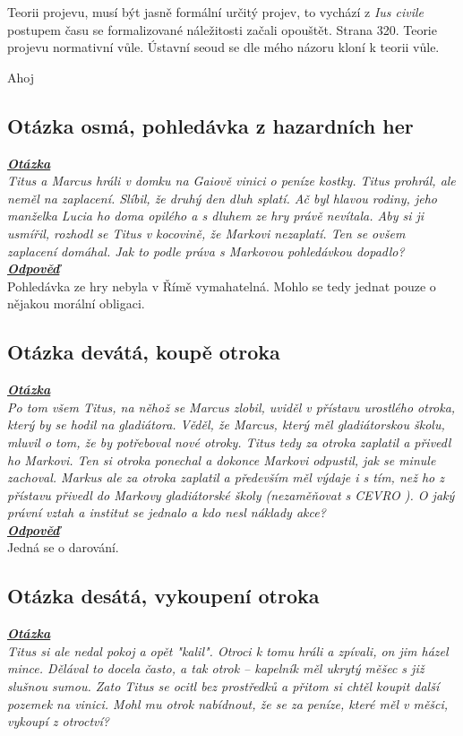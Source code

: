 \documentclass{article}
\begin{document}
Teorii projevu, musí být jasně formální určitý projev, to vychází z \textit{Ius civile} postupem času se formalizované náležitosti začali opouštět.
Strana 320.
Teorie projevu normativní vůle.
Ústavní seoud se dle mého názoru kloní k teorii vůle.

Ahoj

\subsection{Otázka osmá, pohledávka z hazardních her}
\textbf{\textit{\underline{Otázka}}}\\
\textit{Titus a Marcus hráli v domku na Gaiově vinici o peníze kostky. Titus prohrál, ale neměl na zaplacení. Slíbil, že druhý den dluh splatí. Ač byl hlavou rodiny, jeho manželka Lucia ho doma opilého a s dluhem ze hry právě nevítala. Aby si ji usmířil, rozhodl se Titus v kocovině, že Markovi nezaplatí. Ten se ovšem zaplacení domáhal. Jak to podle práva s Markovou pohledávkou dopadlo?}\\

\noindent\noindent\textbf{\textit{\underline{Odpověď}}}\\

Pohledávka ze hry nebyla v Římě vymahatelná. Mohlo se tedy jednat pouze o nějakou morální obligaci.

\subsection{Otázka devátá, koupě otroka}
\textbf{\textit{\underline{Otázka}}}\\
\textit{Po tom všem Titus, na něhož se Marcus zlobil, uviděl v přístavu urostlého otroka, který by se hodil na gladiátora. Věděl, že Marcus, který měl gladiátorskou školu, mluvil o tom, že by potřeboval nové otroky. Titus tedy za otroka zaplatil a přivedl ho Markovi. Ten si otroka ponechal a dokonce Markovi odpustil, jak se minule zachoval. Markus ale za otroka zaplatil a především měl výdaje i s tím, než ho z přístavu přivedl do Markovy gladiátorské školy (nezaměňovat s CEVRO ). O jaký právní vztah a institut se jednalo a kdo nesl náklady akce?}\\

\noindent\noindent\textbf{\textit{\underline{Odpověď}}}\\

Jedná se o darování.

\subsection{Otázka desátá, vykoupení otroka}
\textbf{\textit{\underline{Otázka}}}\\
\textit{Titus si ale nedal pokoj a opět "kalil". Otroci k tomu hráli a zpívali, on jim házel mince. Dělával to docela často, a tak otrok – kapelník měl ukrytý měšec s již slušnou sumou. Zato Titus se ocitl bez prostředků a přitom si chtěl koupit další pozemek na vinici. Mohl mu otrok nabídnout, že se za peníze, které měl v měšci, vykoupí z otroctví?}\\
\end{document}
